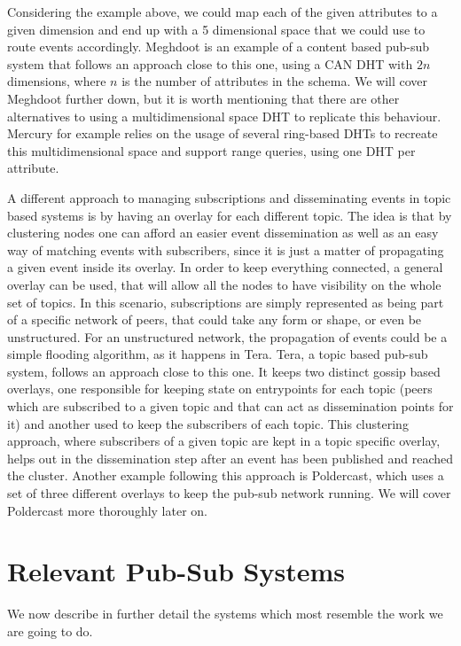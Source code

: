 Considering the example above, we could map each of the given attributes
to a given dimension and end up with a 5 dimensional space that we could
use to route events accordingly. Meghdoot is an example of a content based
pub-sub system that follows an approach close to this one,
using a CAN DHT with $2n$ dimensions, where $n$ is the
number of attributes in the schema. We will cover Meghdoot further down,
but it is worth mentioning that there are other alternatives to using a
multidimensional space DHT to replicate this behaviour. Mercury
for example relies on the usage of several ring-based
DHTs to recreate this multidimensional space and support range queries,
using one DHT per attribute.

A different approach to managing subscriptions and disseminating events in
topic based systems is by having an overlay for each different topic.  The idea
is that by clustering nodes one can afford an easier event dissemination as
well as an easy way of matching events with subscribers, since it is just a
matter of propagating a given event inside its overlay. In order to keep
everything connected, a general overlay can be used, that will allow all the
nodes to have visibility on the whole set of topics. In this scenario,
subscriptions are simply represented as being part of a specific network of
peers, that could take any form or shape, or even be unstructured. For an
unstructured network, the propagation of events could be a simple flooding
algorithm, as it happens in Tera. Tera, a topic based pub-sub system, follows
an approach close to this one. It keeps two distinct gossip based overlays, one
responsible for keeping state on entrypoints for each topic (peers which are
subscribed to a given topic and that can act as dissemination points for it)
and another used to keep the subscribers of each topic. This clustering
approach, where subscribers of a given topic are kept in a topic specific
overlay, helps out in the dissemination step after an event has been published
and reached the cluster. Another example following this approach is Poldercast,
which uses a set of three different overlays to keep the pub-sub network
running. We will cover Poldercast more thoroughly later on.

\section{Relevant Pub-Sub
Systems}\label{relevant-pub-sub-systems}

We now describe in further detail the systems which most resemble the
work we are going to do.

